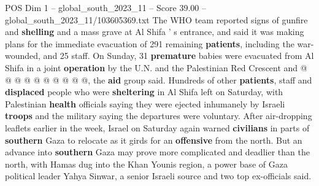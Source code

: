 \begin{textsample}{POS Dim 1 – global\_south\_2023\_11 – Score 39.00 – global\_south\_2023\_11/103605369.txt}
The WHO team reported signs of gunfire and \textbf{shelling} and a mass grave at Al Shifa ' s entrance, and said it was making plans for the immediate evacuation of 291 remaining \textbf{patients}, including the war-wounded, and 25 staff.
On Sunday, 31 \textbf{premature} babies were evacuated from Al Shifa in a joint \textbf{operation} by the U.N. and the Palestinian Red Crescent and @ @ @ @ @ @ @ @ @ @, the \textbf{aid} group said.
Hundreds of other \textbf{patients}, staff and \textbf{displaced} people who were \textbf{sheltering} in Al Shifa left on Saturday, with Palestinian \textbf{health} officials saying they were ejected inhumanely by Israeli \textbf{troops} and the military saying the departures were voluntary.
After air-dropping leaflets earlier in the week, Israel on Saturday again warned \textbf{civilians} in parts of \textbf{southern} Gaza to relocate as it girds for an \textbf{offensive} from the north.
But an advance into \textbf{southern} Gaza may prove more complicated and deadlier than the north, with Hamas dug into the Khan Younis region, a power base of Gaza political leader Yahya Sinwar, a senior Israeli source and two top ex-officials said.

\end{textsample}
